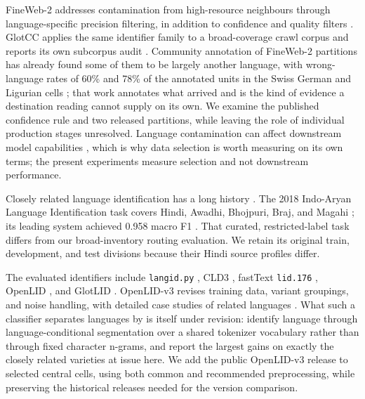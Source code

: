 \documentclass[final]{clv2025}
\newcommand{\lab}[1]{\texttt{#1}}
\begin{document}
FineWeb-2 addresses contamination from high-resource neighbours through language-specific precision filtering, in addition to confidence and quality filters \citep{penedo2025fineweb2}. GlotCC applies the same identifier family to a broad-coverage crawl corpus and reports its own subcorpus audit \citep{kargaran-etal-2024-glotcc}. Community annotation of FineWeb-2 partitions has already found some of them to be largely another language, with wrong-language rates of 60\% and 78\% of the annotated units in the Swiss German and Ligurian cells \citep{vanstrien2025fineweb}; that work annotates what arrived and is the kind of evidence a destination reading cannot supply on its own. We examine the published confidence rule and two released partitions, while leaving the role of individual production stages unresolved. Language contamination can affect downstream model capabilities \citep{blevins-zettlemoyer-2022-language}, which is why data selection is worth measuring on its own terms; the present experiments measure selection and not downstream performance.

Closely related language identification has a long history \citep{jauhiainen-etal-2019-automatic}. The 2018 Indo-Aryan Language Identification task covers Hindi, Awadhi, Bhojpuri, Braj, and Magahi \citep{zampieri-etal-2018-language}; its leading system achieved 0.958 macro F1 \citep{jauhiainen-etal-2018-iterative}. That curated, restricted-label task differs from our broad-inventory routing evaluation. We retain its original train, development, and test divisions because their Hindi source profiles differ.

The evaluated identifiers include \texttt{langid.py} \citep{lui-baldwin-2012-langid}, CLD3 \citep{cld3}, fastText \lab{lid.176} \citep{joulin2016bag,joulin2016fasttextzip}, OpenLID \citep{burchell-etal-2023-open}, and GlotLID \citep{kargaran-etal-2023-glotlid}. OpenLID-v3 revises training data, variant groupings, and noise handling, with detailed case studies of related languages \citep{fedorova-etal-2026-openlid}. What such a classifier separates languages by is itself under revision: \citet{meister-etal-2026-language} identify language through language-conditional segmentation over a shared tokenizer vocabulary rather than through fixed character n-grams, and report the largest gains on exactly the closely related varieties at issue here. We add the public OpenLID-v3 release to selected central cells, using both common and recommended preprocessing, while preserving the historical releases needed for the version comparison.
\end{document}
